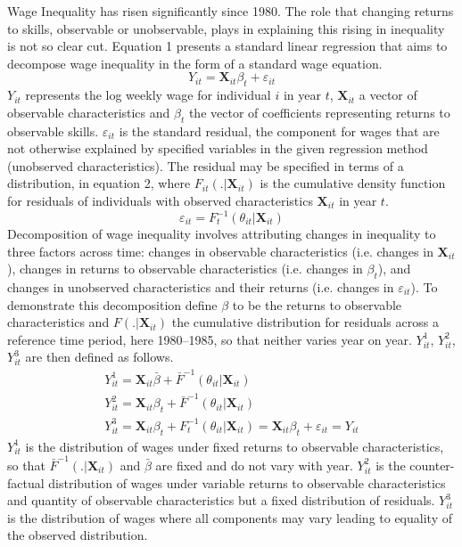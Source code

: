 \documentclass[notitlepage,12pt]{article}
\begin{document}
Wage Inequality has risen significantly since 1980.  The role that changing returns to skills, observable or unobservable, plays in explaining this rising in inequality is not so clear cut.  Equation 1 presents a standard linear regression that aims to decompose wage inequality in the form of a standard wage equation. 
\begin{equation}
Y_{it} = \mathbf{X}_{it}\beta_t + \varepsilon_{it}
\end{equation}
$Y_{it}$ represents the log weekly wage for individual $i$ in year $t$, $\mathbf{X}_{it}$ a vector of observable characteristics and $\beta_t$ the vector of coefficients representing returns to observable skills. $\varepsilon_{it}$ is the standard residual, the component for wages that are not otherwise explained by specified variables in the given regression method (unobserved characteristics).  The residual may be specified in terms of a distribution, in equation 2, where $F_{it}(. | \mathbf{X}_{it})$ is the cumulative density function for residuals of individuals with observed characteristics $\mathbf{X}_{it}$ in year $t$.
\begin{equation}
\varepsilon_{it} = F_{t}^{-1}(\theta_{it} | \mathbf{X}_{it})
\end{equation}
\nocite{autor200914}
Decomposition of wage inequality involves attributing changes in inequality to three factors across time: changes in observable characteristics (i.e. changes in $\mathbf{X}_{it}$), changes in returns to observable characteristics (i.e. changes in $\beta_t$), and changes in unobserved characteristics and their returns (i.e. changes in $\varepsilon_{it}$).  To demonstrate this decomposition define $\beta$ to be the returns to observable characteristics and $F(. | \mathbf{X}_{it})$ the cumulative distribution for residuals across a reference time period, here 1980--1985, so that neither varies year on year.  $Y_{it}^1$, $Y_{it}^2$, $Y_{it}^3$ are then defined as follows.
\begin{gather}
Y_{it}^1 = \mathbf{X}_{it}\bar{\beta} + \bar{F}^{-1}(\theta_{it} | \mathbf{X}_{it}) \\
Y_{it}^2 = \mathbf{X}_{it}\beta_t + \bar{F}^{-1}(\theta_{it} | \mathbf{X}_{it}) \\
Y_{it}^3  = \mathbf{X}_{it}\beta_t + F_{t}^{-1}(\theta_{it} | \mathbf{X}_{it}) = \mathbf{X}_{it}\beta_t + \varepsilon_{it}  = Y_{it}
\end{gather}
$Y_{it}^1$ is the distribution of wages under fixed returns to observable characteristics, so that $\bar{F}^{-1}(. | \mathbf{X}_{it})$ and $\bar{\beta}$ are fixed and do not vary with year.  $Y_{it}^2$ is the counter-factual distribution of wages under variable returns to observable characteristics and quantity of observable characteristics but a fixed distribution of residuals.  $Y_{it}^3$ is the distribution of wages where all components may vary leading to equality of the observed distribution.
\end{document}
